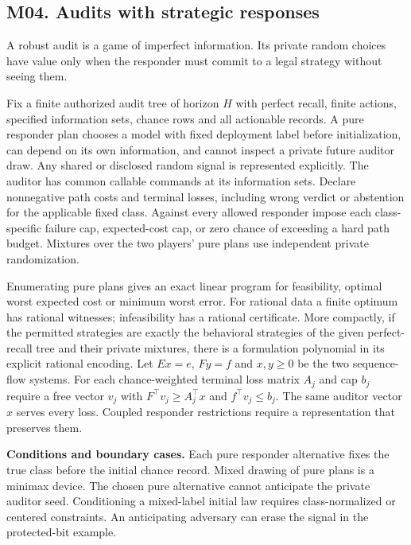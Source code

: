 \subsection{M04. Audits with strategic responses}

\label{ext:m04}

A robust audit is a game of imperfect information. Its private random choices have value only when the responder must commit to a legal strategy without seeing them.

\begin{theorem}\label{ext:m041}

Fix a finite authorized audit tree of horizon \(H\) with perfect recall, finite actions, specified information sets, chance rows and all actionable records. A pure responder plan chooses a model with fixed deployment label before initialization, can depend on its own information, and cannot inspect a private future auditor draw. Any shared or disclosed random signal is represented explicitly. The auditor has common callable commands at its information sets. Declare nonnegative path costs and terminal losses, including wrong verdict or abstention for the applicable fixed class. Against every allowed responder impose each class-specific failure cap, expected-cost cap, or zero chance of exceeding a hard path budget. Mixtures over the two players' pure plans use independent private randomization.

Enumerating pure plans gives an exact linear program for feasibility, optimal worst expected cost or minimum worst error. For rational data a finite optimum has rational witnesses; infeasibility has a rational certificate. More compactly, if the permitted strategies are exactly the behavioral strategies of the given perfect-recall tree and their private mixtures, there is a formulation polynomial in its explicit rational encoding. Let \(Ex=e\), \(Fy=f\) and \(x,y\ge0\) be the two sequence-flow systems. For each chance-weighted terminal loss matrix \(A_j\) and cap \(b_j\) require a free vector \(v_j\) with \(F^\top v_j\ge A_j^\top x\) and \(f^\top v_j\le b_j\). The same auditor vector \(x\) serves every loss. Coupled responder restrictions require a representation that preserves them.

\textbf{Conditions and boundary cases.} Each pure responder alternative fixes the true class before the initial chance record. Mixed drawing of pure plans is a minimax device. The chosen pure alternative cannot anticipate the private auditor seed. Conditioning a mixed-label initial law requires class-normalized or centered constraints. An anticipating adversary can erase the signal in the protected-bit example.

\end{theorem}

